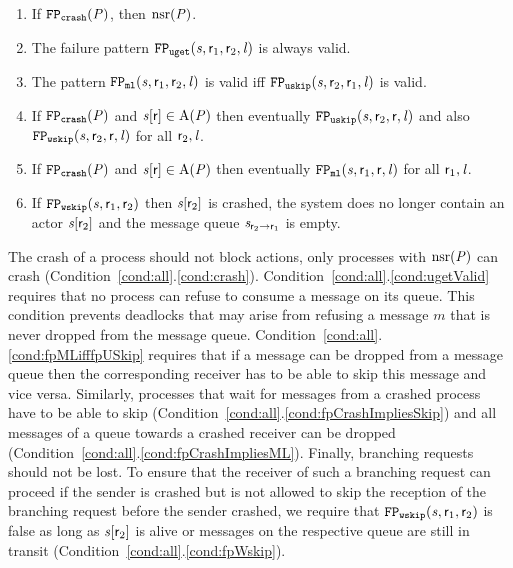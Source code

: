 \begin{condition}
	\label{cond:all}
	\begin{enumerate}
		\item If $ \mathtt{FP}_{\mathtt{crash}}(\mathit{P}) $, then $ {\operatorname{nsr}}{\left( \mathit{P} \right)} $. \label{cond:crash}
		\item The failure pattern $ \mathtt{FP}_{\mathtt{uget}}(\mathit{s}, \mathsf{r}_1, \mathsf{r}_2, \mathit{l}) $ is always valid. \label{cond:ugetValid}
		\item The pattern $ \mathtt{FP}_{\mathtt{ml}}(\mathit{s}, \mathsf{r}_1, \mathsf{r}_2, \mathit{l}) $ is valid iff $ \mathtt{FP}_{\mathtt{uskip}}(\mathit{s}, \mathsf{r}_2, \mathsf{r}_1, \mathit{l}) $ is valid. \label{cond:fpMLifffpUSkip}
		\item If $ \mathtt{FP}_{\mathtt{crash}}(\mathit{P}) $ and $ \mathit{s}{\left[ \mathsf{r} \right]} \in \operatorname{A}\!\left( \mathit{P} \right) $ then eventually $ \mathtt{FP}_{\mathtt{uskip}}(\mathit{s}, \mathsf{r}_2, \mathsf{r}, \mathit{l}) $ and also $ \mathtt{FP}_{\mathtt{wskip}}(\mathit{s}, \mathsf{r}_2, \mathsf{r}, \mathit{l}) $ for all $ \mathsf{r}_2, \mathit{l} $. \label{cond:fpCrashImpliesSkip}
		\item If $ \mathtt{FP}_{\mathtt{crash}}(\mathit{P}) $ and $ \mathit{s}{\left[ \mathsf{r} \right]} \in \operatorname{A}\!\left( \mathit{P} \right) $ then eventually $ \mathtt{FP}_{\mathtt{ml}}(\mathit{s}, \mathsf{r}_1, \mathsf{r}, \mathit{l}) $ for all $ \mathsf{r}_1, \mathit{l} $. \label{cond:fpCrashImpliesML}
		\item If $ \mathtt{FP}_{\mathtt{wskip}}(\mathit{s}, \mathsf{r}_1, \mathsf{r}_2) $ then $ \mathit{s}{\left[ \mathsf{r}_2 \right]} $ is crashed, \ie the system does no longer contain an actor $ \mathit{s}{\left[ \mathsf{r}_2 \right]} $ and the message queue $ \mathit{s}_{\mathsf{r}_2 \to \mathsf{r}_1} $ is empty. \label{cond:fpWskip}
	\end{enumerate}
\end{condition}

The crash of a process should not block \strongR actions, \ie only processes with $ {\operatorname{nsr}}{\left( \mathit{P} \right)} $ can crash (Condition~\ref{cond:all}.\ref{cond:crash}).
Condition~\ref{cond:all}.\ref{cond:ugetValid} requires that no process can refuse to consume a message on its queue.
This condition prevents deadlocks that may arise from refusing a message $ m $ that is never dropped from the message queue.
Condition~\ref{cond:all}.\ref{cond:fpMLifffpUSkip} requires that if a message can be dropped from a message queue then the corresponding receiver has to be able to skip this message and vice versa.
Similarly, processes that wait for messages from a crashed process have to be able to skip (Condition~\ref{cond:all}.\ref{cond:fpCrashImpliesSkip}) and all messages of a queue towards a crashed receiver can be dropped (Condition~\ref{cond:all}.\ref{cond:fpCrashImpliesML}).
Finally, \weakR branching requests should not be lost.
To ensure that the receiver of such a branching request can proceed if the sender is crashed but is not allowed to skip the reception of the branching request before the sender crashed, we require that $ \mathtt{FP}_{\mathtt{wskip}}(\mathit{s}, \mathsf{r}_1, \mathsf{r}_2) $ is false as long as $ \mathit{s}{\left[ \mathsf{r}_2 \right]} $ is alive or messages on the respective queue are still in transit (Condition~\ref{cond:all}.\ref{cond:fpWskip}).

